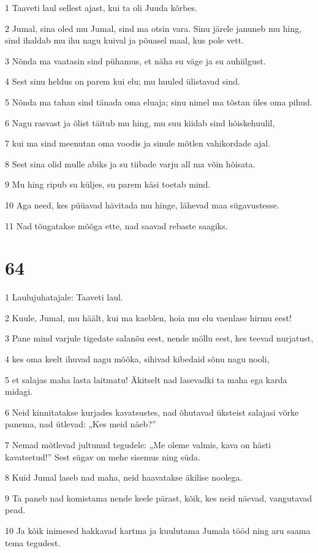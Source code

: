 \par 1 Taaveti laul sellest ajast, kui ta oli Juuda kõrbes.
\par 2 Jumal, sina oled mu Jumal, sind ma otsin vara. Sinu järele januneb mu hing, sind ihaldab mu ihu nagu kuival ja põuasel maal, kus pole vett.
\par 3 Nõnda ma vaatasin sind pühamus, et näha su väge ja su auhiilgust.
\par 4 Sest sinu heldus on parem kui elu; mu huuled ülistavad sind.
\par 5 Nõnda ma tahan sind tänada oma eluaja; sinu nimel ma tõstan üles oma pihud.
\par 6 Nagu rasvast ja õlist täitub mu hing, mu suu kiidab sind hõiskehuulil,
\par 7 kui ma sind meenutan oma voodis ja sinule mõtlen vahikordade ajal.
\par 8 Sest sina olid mulle abiks ja su tiibade varju all ma võin hõisata.
\par 9 Mu hing ripub su küljes, su parem käsi toetab mind.
\par 10 Aga need, kes püüavad hävitada mu hinge, lähevad maa sügavustesse.
\par 11 Nad tõugatakse mõõga ette, nad saavad rebaste saagiks.

\chapter{64}

\par 1 Laulujuhatajale: Taaveti laul.
\par 2 Kuule, Jumal, mu häält, kui ma kaeblen, hoia mu elu vaenlase hirmu eest!
\par 3 Pane mind varjule tigedate salanõu eest, nende möllu eest, kes teevad nurjatust,
\par 4 kes oma keelt ihuvad nagu mõõka, sihivad kibedaid sõnu nagu nooli,
\par 5 et salajas maha lasta laitmatu! Äkitselt nad lasevadki ta maha ega karda midagi.
\par 6 Neid kinnitatakse kurjades kavatsustes, nad õhutavad üksteist salajasi võrke panema, nad ütlevad: „Kes meid näeb?”
\par 7 Nemad mõtlevad jultunud tegudele: „Me oleme valmis, kava on hästi kavatsetud!” Sest sügav on mehe sisemus ning süda.
\par 8 Kuid Jumal laseb nad maha, neid haavatakse äkilise noolega.
\par 9 Ta paneb nad komistama nende keele pärast, kõik, kes neid näevad, vangutavad pead.
\par 10 Ja kõik inimesed hakkavad kartma ja kuulutama Jumala tööd ning aru saama tema tegudest.

